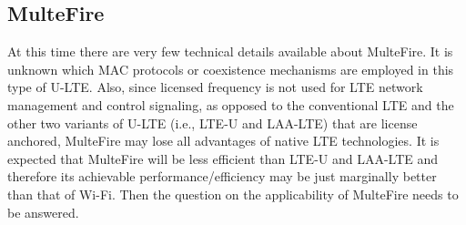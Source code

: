 \subsection{MulteFire}
At this time there are very few technical details available about MulteFire. It is unknown which MAC protocols or coexistence mechanisms are employed in this type of U-LTE. Also, since licensed frequency is not used for LTE network management and control signaling, as opposed to the conventional LTE and the other two variants of U-LTE (i.e., LTE-U and LAA-LTE) that are license anchored, MulteFire may lose all advantages of native LTE technologies. It is expected that MulteFire will be less efficient than LTE-U and LAA-LTE and therefore its achievable performance/efficiency may be just marginally better than that of Wi-Fi. Then the question on the applicability of MulteFire needs to be answered.



